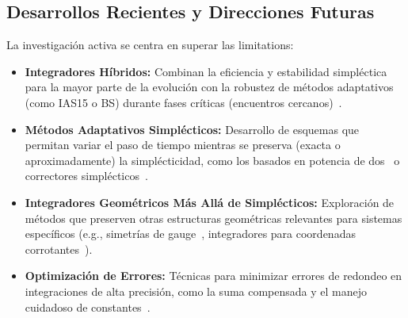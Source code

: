 \subsection{Desarrollos Recientes y Direcciones Futuras}
La investigación activa se centra en superar las limitations:
\begin{itemize}
    \item \textbf{Integradores Híbridos:} Combinan la eficiencia y estabilidad simpléctica para la mayor parte de la evolución con la robustez de métodos adaptativos (como IAS15 o BS) durante fases críticas (encuentros cercanos)~\cite{hernandez2020, rebound_doc, rein2019}.
    \item \textbf{Métodos Adaptativos Simplécticos:} Desarrollo de esquemas que permitan variar el paso de tiempo mientras se preserva (exacta o aproximadamente) la simplécticidad, como los basados en potencia de dos~\cite{Hernandez2015} o correctores simplécticos~\cite{yoshida1990}.
    \item \textbf{Integradores Geométricos Más Allá de Simplécticos:} Exploración de métodos que preserven otras estructuras geométricas relevantes para sistemas específicos (e.g., simetrías de gauge~\cite{glasser2022}, integradores para coordenadas corrotantes~\cite{tu2019}).
    \item \textbf{Optimización de Errores:} Técnicas para minimizar errores de redondeo en integraciones de alta precisión, como la suma compensada y el manejo cuidadoso de constantes~\cite{rebound_doc}.
\end{itemize}